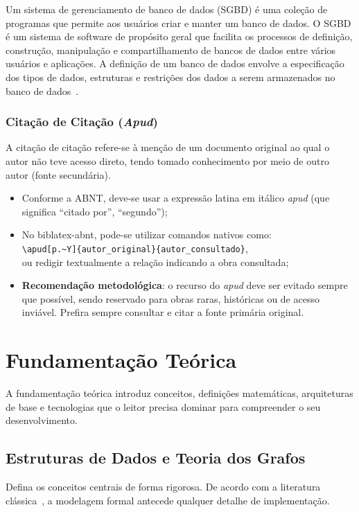 \documentclass[cic,tc,biblatex]{iiufrgs}
\begin{document}
\begin{citacao}
Um sistema de gerenciamento de banco de dados (SGBD) é uma coleção de programas que permite aos usuários criar e manter um banco de dados. O SGBD é um sistema de software de propósito geral que facilita os processos de definição, construção, manipulação e compartilhamento de bancos de dados entre vários usuários e aplicações. A definição de um banco de dados envolve a especificação dos tipos de dados, estruturas e restrições dos dados a serem armazenados no banco de dados~\cite[p.~4]{elmasri2005sistemas}.
\end{citacao}

\subsection{Citação de Citação (\textit{Apud})}
A citação de citação refere-se à menção de um documento original ao qual o autor não teve acesso direto, tendo tomado conhecimento por meio de outro autor (fonte secundária). 

\begin{itemize}
    \item Conforme a ABNT, deve-se usar a expressão latina em itálico \textit{apud} (que significa ``citado por'', ``segundo'');
    \item No \textsf{biblatex-abnt}, pode-se utilizar comandos nativos como:\\
    \verb|\apud[p.~Y]{autor_original}{autor_consultado}|,\\
    ou redigir textualmente a relação indicando a obra consultada;
    \item \textbf{Recomendação metodológica}: o recurso do \textit{apud} deve ser evitado sempre que possível, sendo reservado para obras raras, históricas ou de acesso inviável. Prefira sempre consultar e citar a fonte primária original.
\end{itemize}

\chapter{Fundamentação Teórica}
\label{cap:fundamentacao}

A fundamentação teórica introduz conceitos, definições matemáticas, arquiteturas de base e tecnologias que o leitor precisa dominar para compreender o seu desenvolvimento.

\section{Estruturas de Dados e Teoria dos Grafos}
Defina os conceitos centrais de forma rigorosa. De acordo com a literatura clássica~\cite{elmasri2005sistemas, francois2018deep}, a modelagem formal antecede qualquer detalhe de implementação.
\end{document}
